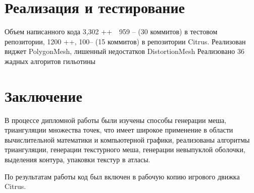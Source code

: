 \documentclass{fefu}
\begin{document}
\section{Реализация и тестирование}
Объем написанного кода 3,302 ++  959 -- (30 коммитов) в тестовом репозитории, 1200 ++, 100-- (15 коммитов) в репозитории Citrus.
Реализован виджет PolygonMesh, лишенный недостатков DistortionMesh
Реализовано 36 жадных алгоритов гильотины
\section*{Заключение}
В процессе дипломной работы были изучены способы генерации меша, триангуляции множества точек, что имеет широкое
применение в области вычислительной математики и компьютерной графики, реализованы алгоритмы триангуляции, генерации
текстурного меша, генерации невыпуклой оболочки, выделения контура, упаковки текстур в атласы.

По результатам работы код был включен в рабочую копию игрового движка Citrus.
\newpage


\end{document}

